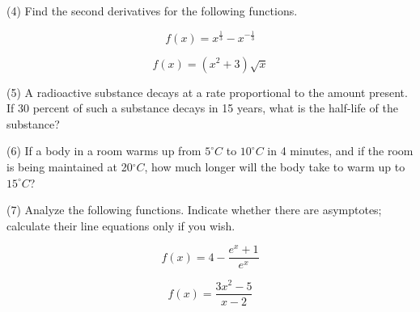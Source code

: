 \documentclass[11pt]{article}
\begin{document}
(4) Find the second derivatives for the following functions.

\begin{equation}
  \label{eq:eaghohpo}
  f(x)=x^{\frac{1}{3}}-x^{-\frac{1}{3}}
\end{equation}

\begin{equation}
  \label{eq:boopeesh}
  f(x)=(x^{2}+3)\sqrt{x}
\end{equation}

(5) A radioactive substance decays at a rate proportional to the
amount present. If 30 percent of such a substance decays in 15 years,
what is the half-life of the substance?

(6) If a body in a room warms up from $5^{\circ}C$ to $10^{\circ}C$ in
4 minutes, and if the room is being maintained at 20$^{\circ}C$, how
much longer will the body take to warm up to $15^{\circ}C$?

(7) Analyze the following functions. Indicate whether there are
asymptotes; calculate their line equations only if you wish.

\begin{equation}
  \label{eq:ahkeique}
  f(x)=4-\frac{e^{x}+1}{e^{x}}
\end{equation}

\begin{equation}
  \label{eq:mohsixox}
  f(x)=\frac{3x^{2}-5}{x-2}
\end{equation}
\end{document}
